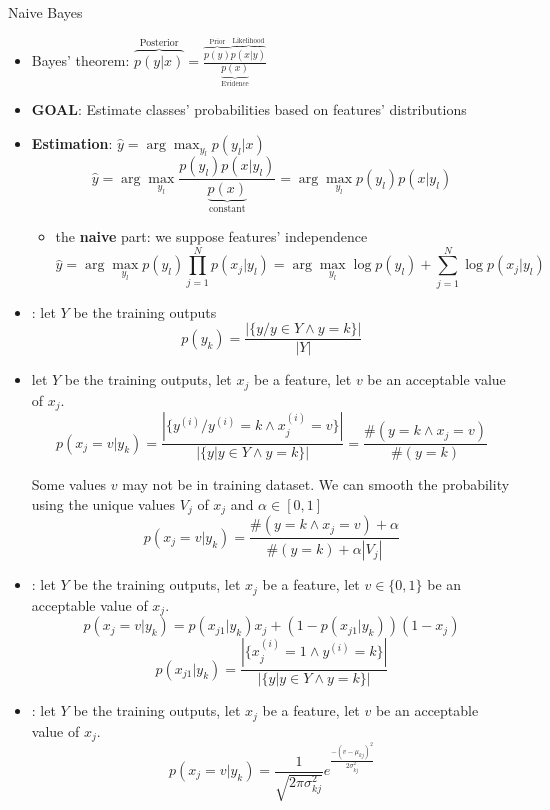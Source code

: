 \documentclass{KBook}
\begin{document}
	Naive Bayes
	
	\begin{itemize}
		\item Bayes' theorem: $ \overbrace{p(y|x)}^\text{Posterior} = \frac{\overbrace{p(y)}^\text{Prior} \overbrace{p(x|y)}^{\text{Likelihood}}}{\underbrace{p(x)}_\text{Evidence}}$
		\item \textbf{GOAL}: Estimate classes' probabilities based on features' distributions
		\item \textbf{Estimation}: $ \hat{y} = \arg\max_{y_l} p(y_l|x)$
		\[\hat{y} = \arg\max_{y_l} \frac{p(y_l) p(x|y_l)}{\underbrace{p(x)}_\text{constant}} = \arg\max_{y_l} p(y_l) p(x|y_l)\]
		\begin{itemize}
			\item the \textbf{naive} part: we suppose features' independence
			\[\hat{y} = \arg\max_{y_l} p(y_l) \prod_{j=1}^{N} p(x_j|y_l) = \arg\max_{y_l} \log p(y_l) + \sum_{j=1}^{N} \log p(x_j|y_l)\]
		\end{itemize}
	\end{itemize}
	

	
	\begin{itemize}
		\item {}: let $ Y $ be the training outputs
		\[p(y_k) = \frac{|\{y / y \in Y \wedge y = k\}|}{|Y|}\]
		
		\item {} let $ Y $ be the training outputs, let $ x_j $ be a feature, let $ v $ be an acceptable value of $ x_j $.
		\[p(x_j = v|y_k) = \frac{|\{y^{(i)} / y^{(i)} = k \wedge x^{(i)}_j = v\}|}{|\{y | y \in Y \wedge y = k\}|} = \frac{\#(y = k \wedge x_j = v)}{\#(y = k)}\]
		
		Some values $v$ may not be in training dataset. We can smooth the probability using the unique values $ V_j $ of $ x_j $ and $ \alpha \in [0, 1] $
		\[p(x_j = v|y_k) = \frac{\#(y = k \wedge x_j = v) + \alpha}{\#(y = k) + \alpha |V_j|}\]
	\end{itemize}
	

	
	\begin{itemize}
		\item {}: let $ Y $ be the training outputs, let $ x_j $ be a feature, let $ v \in \{0, 1\}$ be an acceptable value of $ x_j $.
		\[p(x_j = v|y_k) = p(x_{j1}|y_k) x_j + (1-p(x_{j1}|y_k)) (1-x_j)\]
		\[p(x_{j1}|y_k) = \frac{|\{x_j^{(i)} = 1 \wedge y^{(i)} = k\}|}{|\{y | y \in Y \wedge y = k\}|}\]
		\item {}: let $ Y $ be the training outputs, let $ x_j $ be a feature, let $ v $ be an acceptable value of $ x_j $.
		\[p(x_j = v|y_k) = \frac{1}{\sqrt{2\pi \sigma_{kj}^2}} e^\frac{-(v-\mu_{kj})^2}{2 \sigma_{kj}^2}\]
	\end{itemize}
	
\end{document}
